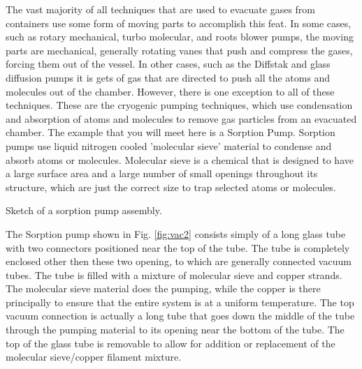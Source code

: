 The vast majority of all techniques that are used to evacuate gases from containers use some form of moving parts to accomplish this feat. In some cases, such as rotary mechanical, turbo molecular, and roots blower pumps, the moving parts are mechanical, generally rotating vanes that push and compress the gases, forcing them out of the vessel. In other cases, such as the Diffstak and glass diffusion pumps it is gets of gas that are directed to push all the atoms and molecules out of the chamber. However, there is one exception to all of these techniques.  These are the cryogenic pumping techniques, which use condensation and absorption of atoms and molecules to remove gas particles from an evacuated chamber. The example that you will meet here is a Sorption Pump. Sorption pumps use liquid nitrogen cooled 'molecular sieve' material to condense and absorb atoms or molecules. Molecular sieve is a chemical that is designed to have a large surface area and a large number of small openings throughout its structure, which are just the correct size to trap selected atoms or molecules.

\begin{marginfigure}
\caption{Sketch of a sorption pump assembly.}
\label{fig:vac2}
\end{marginfigure}

The Sorption pump shown in Fig. \ref{fig:vac2} consists simply of a long glass tube with two connectors positioned near the top of the tube. The tube is completely enclosed other then these two opening, to which are generally connected vacuum tubes. The tube is filled with a mixture of molecular sieve and copper strands. The molecular sieve material does the pumping, while the copper is there principally to ensure that the entire system is at a uniform temperature. The top vacuum connection is actually a long tube that goes down the middle of the tube through the pumping material to its opening near the bottom of the tube. The top of the glass tube is removable to allow for addition or replacement of the molecular sieve/copper filament mixture.

